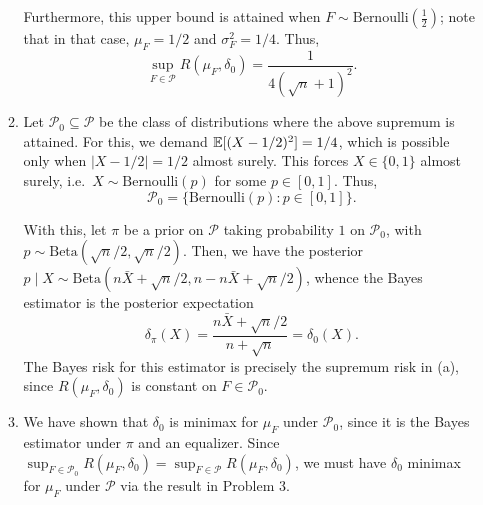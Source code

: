 \documentclass[11pt]{article}
\begin{document}
\begin{enumerate}
\begin{enumerate}
            Furthermore, this upper bound is attained when $F \sim
            \text{Bernoulli}(\frac{1}{2})$; note that in that case, $\mu_F = 1
            / 2$ and $\sigma^2_F = 1 / 4$.
            Thus, \[
                \sup_{F \in \mathcal{P}} R(\mu_F, \delta_0)
                    = \frac{1}{4(\sqrt{n} + 1)^2}.
            \]


            \item Let $\mathcal{P}_0 \subseteq \mathcal{P}$ be the class of
            distributions where the above supremum is attained.
            For this, we demand $\mathbb{E}[(X - 1 / 2)^2] = 1 / 4$, which is possible
            only when $|X - 1 / 2| = 1 / 2$ almost surely.
            This forces $X \in \{0, 1\}$ almost surely, i.e.\ $X \sim
            \text{Bernoulli}(p)$ for some $p \in [0, 1]$.
            Thus, \[
                \mathcal{P}_0 = \{\text{Bernoulli}(p)\colon p \in [0, 1]\}.
            \]

            With this, let $\pi$ be a prior on $\mathcal{P}$ taking probability
            $1$ on $\mathcal{P}_0$, with $p \sim \text{Beta}(\sqrt{n} / 2,
            \sqrt{n} / 2)$.
            Then, we have the posterior $p \mid X \sim \text{Beta}(n\bar{X} +
            \sqrt{n} / 2, n - n\bar{X} + \sqrt{n} / 2)$, whence the Bayes
            estimator is the posterior expectation \[
                \delta_\pi(X)
                    = \frac{n\bar{X} + \sqrt{n}/2}{n + \sqrt{n}}
                    = \delta_0(X).
            \] The Bayes risk for this estimator is precisely the supremum risk
            in (a), since $R(\mu_F, \delta_0)$ is constant on $F \in
            \mathcal{P}_0$.


            \item We have shown that $\delta_0$ is minimax for $\mu_F$ under
            $\mathcal{P}_0$, since it is the Bayes estimator under $\pi$ and
            an equalizer.
            Since $\sup_{F \in \mathcal{P}_0} R(\mu_F, \delta_0) = \sup_{F \in
            \mathcal{P}} R(\mu_F, \delta_0)$, we must have $\delta_0$ minimax
            for $\mu_F$ under $\mathcal{P}$ via the result in Problem 3.

        \end{enumerate}

    \end{enumerate}
\end{document}
